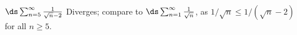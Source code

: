 {$\ds \sum_{n=5}^\infty \frac{1}{\sqrt{n}-2}$
}
{Diverges; compare to $\ds \sum_{n=1}^\infty \frac{1}{\sqrt n}$, as $1/\sqrt n \leq 1/(\sqrt{n}-2)$ for all $n\geq 5$. 
}